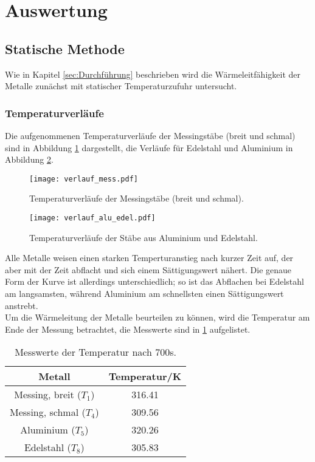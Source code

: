 \section{Auswertung}
\label{sec:Auswertung}

\subsection{Statische Methode}
  Wie in Kapitel \ref{sec:Durchführung} beschrieben wird die Wärmeleitfähigkeit der Metalle zunächst mit statischer Temperaturzufuhr untersucht.

  \subsubsection{Temperaturverläufe}
  Die aufgenommenen Temperaturverläufe der Messingstäbe (breit und schmal) sind in Abbildung \ref{fig:messingstat} dargestellt, die Verläufe für Edelstahl und
  Aluminium in Abbildung \ref{fig:aluedelstat}.\\


  \begin{figure}
    \centering
    \texttt{[image: verlauf\_mess.pdf]}
    \caption{Temperaturverläufe der Messingstäbe (breit und schmal).}
    \label{fig:messingstat}
  \end{figure}

  \begin{figure}
    \centering
    \texttt{[image: verlauf\_alu\_edel.pdf]}
    \caption{Temperaturverläufe der Stäbe aus Aluminium und Edelstahl.}
    \label{fig:aluedelstat}
  \end{figure}
  \FloatBarrier

  \noindent Alle Metalle weisen einen starken Temperturanstieg nach kurzer Zeit auf, der aber mit der Zeit abflacht und sich einem Sättigungswert nähert. 
  Die genaue Form der Kurve ist allerdings unterschiedlich; so ist das Abflachen bei Edelstahl am langsamsten, während Aluminium am schnellsten
  einen Sättigungswert anstrebt.\\

  \noindent Um die Wärmeleitung der Metalle beurteilen zu können, wird die Temperatur am Ende der Messung betrachtet, die Messwerte sind in \ref{tab:setecientos} 
  aufgelistet.

  \begin{table}
    \centering
    \caption{Messwerte der Temperatur nach 700s.}
    \label{tab:setecientos}
    \begin{tabular}{c c}
      \toprule
      Metall & Temperatur/K \\
      \midrule
      Messing, breit ($T_1$) & 316.41 \\
      Messing, schmal ($T_4$)& 309.56\\
      Aluminium ($T_5$)& 320.26\\
      Edelstahl ($T_8$)& 305.83\\
      \bottomrule
    \end{tabular}
  \end{table}
  \FloatBarrier

